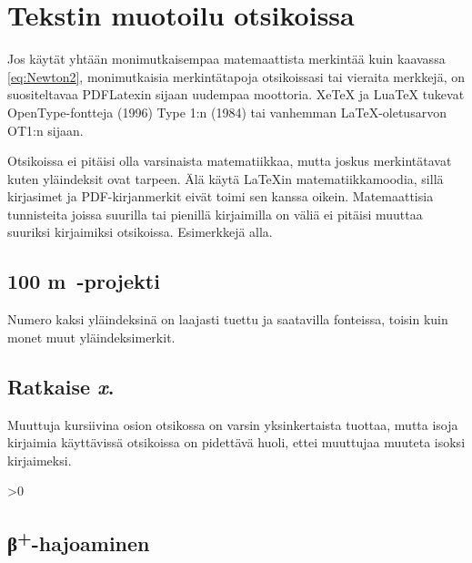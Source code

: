 \documentclass[globalnumbering,centeredcaptions]{tutthesis/tutthesis} %
\begin{document}
\section{Tekstin muotoilu otsikoissa}

Jos käytät yhtään monimutkaisempaa matemaattista merkintää kuin kaavassa \eqref{eq:Newton2}, monimutkaisia merkintätapoja otsikoissasi tai vieraita merkkejä, on suositeltavaa PDFLatexin sijaan uudempaa moottoria.
XeTeX ja LuaTeX tukevat OpenType-fontteja (1996) Type 1:n (1984) tai vanhemman LaTeX-oletusarvon OT1:n sijaan.

Otsikoissa ei pitäisi olla varsinaista matematiikkaa, mutta joskus merkintätavat kuten yläindeksit ovat tarpeen.
Älä käytä LaTeXin matematiikkamoodia, sillä kirjasimet ja PDF-kirjanmerkit eivät toimi sen kanssa oikein.
Matemaattisia tunnisteita joissa suurilla tai pienillä kirjaimilla on väliä ei pitäisi muuttaa suuriksi kirjaimiksi otsikoissa.
Esimerkkejä alla.

\subsection{100 m\texttwosuperior\ -projekti}

Numero kaksi yläindeksinä on laajasti tuettu ja saatavilla fonteissa, toisin kuin monet muut yläindeksimerkit.

\newcommand*{\varx}{x}
\subsection{Ratkaise \textit{\protect\varx}.} %

Muuttuja kursiivina osion otsikossa on varsin yksinkertaista tuottaa, mutta isoja kirjaimia käyttävissä otsikoissa on pidettävä huoli, ettei muuttujaa muuteta isoksi kirjaimeksi.

\newcommand*{\plussuperior}{\textsuperscript{+}}

\fi{}\fi>0
  \newcommand*{\tbeta}{β}
  \subsection{\protect\tbeta\plussuperior-hajoaminen} %
\else\ifx\textgreekfontmap\undefined\else
\end{document}
